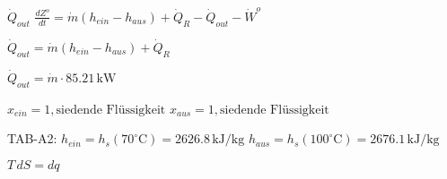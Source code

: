\( \dot{Q}_{out} \)  
\( \frac{dZ^o}{dt} = \dot{m} (h_{ein} - h_{aus}) + \dot{Q}_R - \dot{Q}_{out} - \dot{W}^o \)  

\( \dot{Q}_{out} = \dot{m} (h_{ein} - h_{aus}) + \dot{Q}_R \)  

\( \dot{Q}_{out} = \dot{m} \cdot 85.21 \, \text{kW} \)  

\( x_{ein} = 1, \text{siedende Flüssigkeit} \)  
\( x_{aus} = 1, \text{siedende Flüssigkeit} \)  

TAB-A2:  
\( h_{ein} = h_s(70^\circ \text{C}) = 2626.8 \, \text{kJ/kg} \)  
\( h_{aus} = h_s(100^\circ \text{C}) = 2676.1 \, \text{kJ/kg} \)  

\( T \, dS = dq \)